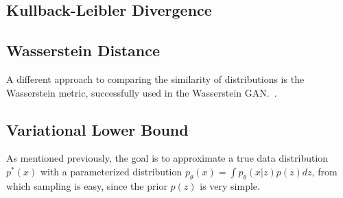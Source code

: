 \subsection{Kullback-Leibler Divergence}

\subsection{Wasserstein Distance}
A different approach to comparing the similarity of distributions is the Wasserstein metric, successfully used in the Wasserstein GAN.~\autocite{arjovsky2017wasserstein}.

\subsection{Variational Lower Bound}
As mentioned previously, the goal is to approximate a true data distribution $p^*(x)$ with a parameterized distribution $p_\theta(x) = \int p_\theta(x|z)p(z)dz$, from which sampling is easy, since the prior $p(z)$ is very simple.